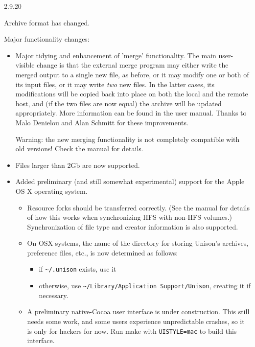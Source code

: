 \begin{changesfromversion}{2.9.20}
\item \incompatible{} Archive format has changed.  
\item Major functionality changes:
\begin{itemize}
\item Major tidying and enhancement of 'merge' functionality.  The main
  user-visible change is that the external merge program may either write
  the merged output to a single new file, as before, or it may modify one or
  both of its input files, or it may write {\em two} new files.  In the
  latter cases, its modifications will be copied back into place on both the
  local and the remote host, and (if the two files are now equal) the
  archive will be updated appropriately.  More information can be found in
  the user manual.  Thanks to Malo Denielou and Alan Schmitt for these
  improvements.

  Warning: the new merging functionality is not completely compatible with
  old versions!  Check the manual for details.
  
\item Files larger than 2Gb are now supported.

\item Added preliminary (and still somewhat experimental) support for the
  Apple OS X operating system.   
\begin{itemize}
\item Resource forks should be transferred correctly.  (See the manual for
details of how this works when synchronizing HFS with non-HFS volumes.)
Synchronization of file type and creator information is also supported.
\item On OSX systems, the name of the directory for storing Unison's
archives, preference files, etc., is now determined as follows:
\begin{itemize}
    \item if \verb+~/.unison+ exists, use it
     \item otherwise, use \verb|~/Library/Application Support/Unison|, 
         creating it if necessary.
\end{itemize}
\item A preliminary native-Cocoa user interface is under construction.  This
still needs some work, and some users experience unpredictable crashes, so
it is only for hackers for now.  Run make with {\tt UISTYLE=mac} to build
this interface.
\end{itemize}
\end{itemize}


\end{changesfromversion}
